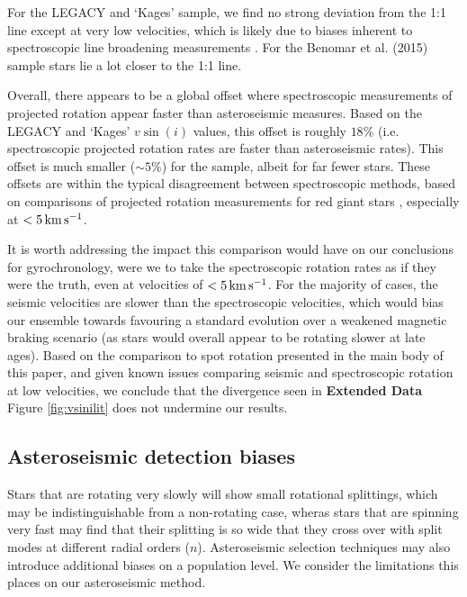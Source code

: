 For the LEGACY and `Kages' sample, we find no strong deviation from the 1:1 line except at very low velocities, which is likely due to biases inherent to spectroscopic line broadening measurements \cite{m_doyle+2014, m_tayar+2015}. For the Benomar et al. (2015) sample stars lie a lot closer to the 1:1 line.

Overall, there appears to be a global offset where spectroscopic measurements of projected rotation appear faster than asteroseismic measures. Based on the LEGACY and `Kages' $v\sin(i)$ values, this offset is roughly $18\%$ (i.e. spectroscopic projected rotation rates are faster than asteroseismic rates). This offset is much smaller ($\sim5\%$) for the \cite{m_benomar+2015} sample, albeit for far fewer stars. These offsets are within the typical disagreement between spectroscopic methods, based on comparisons of projected rotation measurements for red giant stars \cite[see Figure 2]{m_tayar+2015}, especially at $< 5\, \rm{km\,s^{-1}}$.

It is worth addressing the impact this comparison would have on our conclusions for gyrochronology, were we to take the spectroscopic rotation rates as if they were the truth, even at velocities of $< 5\, \rm{km\,s^{-1}}$. For the majority of cases, the seismic velocities are slower than the spectroscopic velocities, which would bias our ensemble towards favouring a standard evolution over a weakened magnetic braking scenario (as stars would overall appear to be rotating slower at late ages). Based on the comparison to spot rotation presented in the main body of this paper, and given known issues comparing seismic and spectroscopic rotation at low velocities, we conclude that the divergence seen in  \textbf{Extended Data} Figure \ref{fig:vsinilit} does not undermine our results.

\subsection{Asteroseismic detection biases}

Stars that are rotating very slowly will show small rotational splittings, which may be indistinguishable from a non-rotating case, wheras stars that are spinning very fast may find that their splitting is so wide that they cross over with split modes at different radial orders ($n$). Asteroseismic selection techniques may also introduce additional biases on a population level. We consider the limitations this places on our asteroseismic method.

